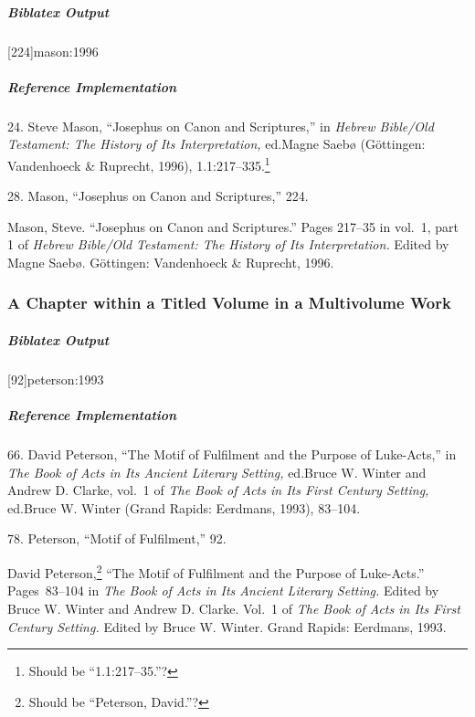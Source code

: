 \documentclass[a4paper]{article}
\renewcommand{\slash}{/\penalty\exhyphenpenalty\hspace{0pt}}
\newenvironment{biboutput}{%
  \subparagraph{Biblatex Output}
}{\color{black}}
\newenvironment{refimp}{%
  \subparagraph{Reference Implementation}
  \color{reference-colour}
  \rm
}{\par\color{black}}
\begin{document}
\begin{biboutput}
  [224]{mason:1996}
\end{biboutput}

\begin{refimp}
  \hspace*{\bibindent}24. Steve Mason, “Josephus on Canon and Scriptures,” in
  \emph{Hebrew Bible\slash Old Testament: The History of Its Interpretation,}
  ed.\@ Magne Saebø (Göttingen: Vandenhoeck \& Ruprecht, 1996),
  1.1:217–335.\footnote{Should be “1.1:217–35.”?}

  \hspace*{\bibindent}28. Mason, “Josephus on Canon and Scriptures,” 224.

  \hangindent\bibindent Mason, Steve. “Josephus on Canon and Scriptures.”
  Pages 217–35 in vol.~1, part 1 of \emph{Hebrew Bible\slash Old Testament:
  The History of Its Interpretation.} Edited by Magne Saebø. Göttingen:
  Vandenhoeck \& Ruprecht, 1996.
\end{refimp}

\subsubsection{A Chapter within a Titled Volume in a Multivolume Work}

\begin{biboutput}
  [92]{peterson:1993}
\end{biboutput}

\begin{refimp}
  \hspace*{\bibindent}66. David Peterson, “The Motif of Fulfilment and the
  Purpose of Luke-Acts,” in \emph{The Book of Acts in Its Ancient Literary
  Setting,} ed.\@ Bruce W. Winter and Andrew D. Clarke, vol.~1 of \emph{The
  Book of Acts in Its First Century Setting,} ed.\@ Bruce W. Winter (Grand
  Rapids: Eerdmans, 1993), 83–104.

  \hspace*{\bibindent}78. Peterson, “Motif of Fulfilment,” 92.

  \hangindent\bibindent David Peterson,\footnote{Should be “Peterson,
  David.”?} “The Motif of Fulfilment and the Purpose of Luke-Acts.”
  Pages~83–104 in \emph{The Book of Acts in Its Ancient Literary Setting.}
  Edited by Bruce W. Winter and Andrew D. Clarke. Vol.~1 of \emph{The Book of
  Acts in Its First Century Setting.} Edited by Bruce W. Winter. Grand Rapids:
  Eerdmans, 1993.
\end{refimp}
\end{document}
